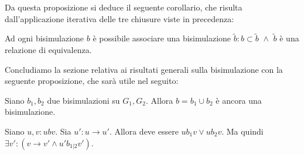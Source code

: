 Da questa proposizione si deduce il seguente corollario, che risulta dall'applicazione iterativa delle tre chiusure viste in precedenza:
\begin{corollary}
    Ad ogni bisimulazione $b$ è possibile associare una bisimulazione $\widetilde{b} : b \subset \widetilde{b} \,\,\land\,\, \widetilde{b}$ è una relazione di equivalenza.
    \label{cor:bisimulation_eqrel}
\end{corollary}
Concludiamo la sezione relativa ai risultati generali sulla bisimulazione con la seguente proposizione, che sarà utile nel seguito:
\begin{proposition}
    Siano $b_1, b_2$ due bisimulazioni su $G_1, G_2$. Allora $b = b_1 \cup b_2$ è ancora una bisimulazione.
    \label{obs:bisimulation_union}
\end{proposition}
\begin{proof2}
    Siano $u,v : u b v$. Sia $u' : u \to u'$. Allora deve essere $u b_1 v \lor u b_2 v$. Ma quindi $\exists v' : (v \to v' \land u' b_{1|2} v')$.
\end{proof2}

